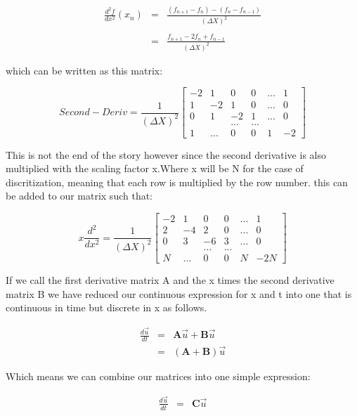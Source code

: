 \documentclass[12pt]{article}
\begin{document}
\begin{eqnarray*}
\frac{d^2 f}{dx^2}(x_{n}) &=& \frac{(f_{n+1} - f_{n}) - (f_{n} - f_{n-1})}{(\Delta X)^2}\\
\\
&=& \frac{f_{n+1} - 2f_{n} + f_{n-1}}{(\Delta X)^{2}}
\end{eqnarray*}

which can be written as this matrix:

\[
Second-Deriv = \frac{1}{(\Delta X)^{2}}
\begin{bmatrix}
-2 & 1 & 0 & 0 & ... & 1\\
1 & -2 & 1 & 0 & ... & 0\\
0 & 1 & -2 & 1 & ... & 0\\
  &   & ...&...&     &  \\
1 & ... & 0 & 0 & 1 & -2   
\end{bmatrix}
\]

This is not the end of the story however since the second derivative is also multiplied with the scaling factor x.Where x will be N for the case of discritization, meaning that each row is multiplied by the row number. this can be added to our matrix such that:

\[
x\frac{d^{2}}{dx^{2}} = \frac{1}{(\Delta X)^{2}}
\begin{bmatrix}
-2 & 1 & 0 & 0 & ... & 1\\
2 & -4 & 2 & 0 & ... & 0\\
0 & 3 & -6 & 3 & ... & 0\\
  &   & ...&...&     &  \\
N & ... & 0 & 0 & N & -2N 
\end{bmatrix}
\]

If we call the first derivative matrix A and the x times the second derivative matrix B we have reduced our continuous expression for x and t into one that is continuous in time but discrete in x as follows.

\begin{eqnarray*}
\frac{d \vec{u}}{dt} &=&  \textbf{A}\vec{u} + \textbf{B}\vec{u}\\
&=&(\textbf{A}+\textbf{B})\vec{u}
\end{eqnarray*}

Which means we can combine our matrices into one simple expression:

\begin{eqnarray*}
\frac{d \vec{u}}{dt} &=& \textbf{C} \vec{u}
\end{eqnarray*}
\end{document}
